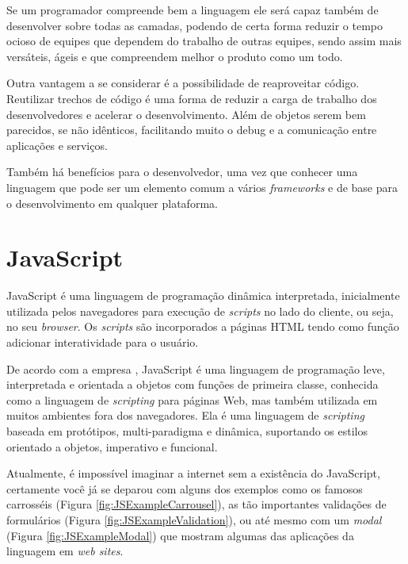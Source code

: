 \documentclass[
	12pt,				%
	openright,			%
	twoside,			%
	a4paper,			%
	english,			%
	brazil				%
	]{abntex2}
\begin{document}
Se um programador compreende bem a linguagem ele será capaz também de desenvolver sobre todas as camadas, podendo de certa forma reduzir o tempo ocioso de equipes que dependem do trabalho de outras equipes, sendo assim mais versáteis, ágeis e que compreendem melhor o produto como um todo.

Outra vantagem a se considerar é a possibilidade de reaproveitar código. Reutilizar trechos de código é uma forma de reduzir a carga de trabalho dos desenvolvedores e acelerar o desenvolvimento. Além de objetos serem bem parecidos, se não idênticos, facilitando muito o debug e a comunicação entre aplicações e serviços.

Também há benefícios para o desenvolvedor, uma vez que conhecer uma linguagem que pode ser um elemento comum a vários \textit{frameworks} e de base para o desenvolvimento em qualquer plataforma.

\section{JavaScript}


JavaScript é uma linguagem de programação dinâmica interpretada, inicialmente utilizada pelos navegadores para execução de \textit{scripts} no lado do cliente, ou seja, no seu \textit{browser}. Os \textit{scripts} são incorporados a páginas HTML tendo como função adicionar interatividade para o usuário.

De acordo com a empresa \citeauthor{mdn_javascript}, JavaScript é uma linguagem de programação leve, interpretada e orientada a objetos com funções de primeira classe, conhecida como a linguagem de \textit{scripting} para páginas Web, mas também utilizada em muitos ambientes fora dos navegadores. Ela é uma linguagem de \textit{scripting} baseada em protótipos, multi-paradigma e dinâmica, suportando os estilos orientado a objetos, imperativo e funcional.

Atualmente, é impossível imaginar a internet sem a existência do JavaScript, certamente você já se deparou com alguns dos exemplos como os famosos carrosséis (Figura \ref{fig:JSExampleCarrousel}), as tão importantes validações de formulários (Figura \ref{fig:JSExampleValidation}), ou até mesmo com um \textit{modal} (Figura \ref{fig:JSExampleModal}) que mostram algumas das aplicações da linguagem em \textit{web sites}.
\end{document}
